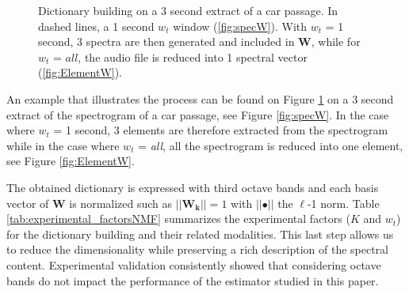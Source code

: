 \documentclass[twocolumn]{svjour3}          %
\begin{document}
\begin{figure}[t]
  \centering
  \caption{Dictionary building on a 3 second extract of a car passage. In dashed lines, a 1 second $w_t$ window  (\ref{fig:specW}). With $w_t$ = 1 second, 3 spectra are then generated and included in $\mathbf{W}$, while for $w_t$ = $all$, the audio file is reduced into 1 spectral vector (\ref{fig:ElementW}).}
  \label{fig:spec_elementW}
\end{figure}


An example that illustrates the process can be found on Figure \ref{fig:spec_elementW} on a 3 second extract of the spectrogram of a car passage, see Figure \ref{fig:specW}. In the case where $w_t$ = 1 second, 3 elements are therefore extracted from the spectrogram while in the case where $w_t$ = \textit{all}, all the spectrogram is reduced into one element, see Figure \ref{fig:ElementW}.

The obtained dictionary is expressed with third octave bands and each basis vector of $\mathbf{W}$ is normalized such as $\vert \vert \mathbf{W_k} \vert \vert = 1$ with $\vert \vert \bullet \vert\vert$ the $\ell$-1 norm. Table \ref{tab:experimental_factorsNMF} summarizes the experimental factors ($K$ and $w_t$) for the dictionary building and their related modalities. This last step allows us to reduce the dimensionality while preserving a rich description of the spectral content. Experimental validation consistently showed that considering octave bands do not impact the performance of the estimator studied in this paper.
\end{document}
